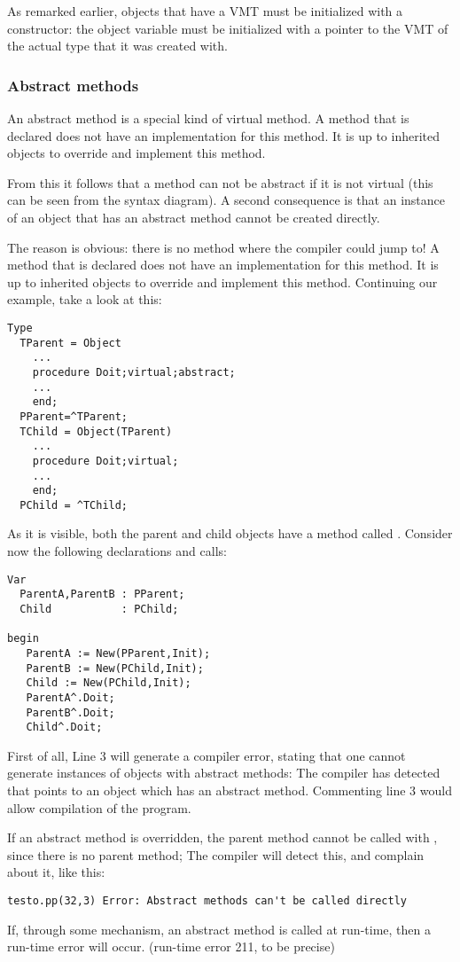 As remarked earlier, objects that have a VMT must be initialized with a
constructor: the object variable must be initialized with a pointer to
the VMT of the actual type that it was created with.

%
\subsubsection{Abstract methods}
An abstract method is a special kind of virtual method. A method that is
declared  does not have an implementation for this method.
It is up to inherited objects to override and implement this method.

From this it follows that a method can not be abstract if it is not virtual
(this can be seen from the syntax diagram). A second consequence is that
an instance of an object that has an abstract method cannot be created
directly.

The reason is obvious: there is no method where the compiler could jump to!
A method that is declared  does not have an implementation for
this method. It is up to inherited objects to override and implement this
method. Continuing our example, take a look at this:
\begin{verbatim}
Type
  TParent = Object
    ...
    procedure Doit;virtual;abstract;
    ...
    end;
  PParent=^TParent;
  TChild = Object(TParent)
    ...
    procedure Doit;virtual;
    ...
    end;
  PChild = ^TChild;
\end{verbatim}
As it is visible, both the parent and child objects have a method called
. Consider now the following declarations and calls:
\begin{verbatim}
Var
  ParentA,ParentB : PParent;
  Child           : PChild;

begin
   ParentA := New(PParent,Init);
   ParentB := New(PChild,Init);
   Child := New(PChild,Init);
   ParentA^.Doit;
   ParentB^.Doit;
   Child^.Doit;
\end{verbatim}
First of all, Line 3 will generate a compiler error, stating that one cannot
generate instances of objects with abstract methods: The compiler has
detected that  points to an object which has an abstract
method. Commenting line 3 would allow compilation of the program.
\begin{remark}
If an abstract method is overridden, the parent method cannot be called
with , since there is no parent method; The compiler
will detect this, and complain about it, like this:
\begin{verbatim}
testo.pp(32,3) Error: Abstract methods can't be called directly
\end{verbatim}
If, through some mechanism, an abstract method is called at run-time,
then a run-time error will occur. (run-time error 211, to be precise)
\end{remark}

